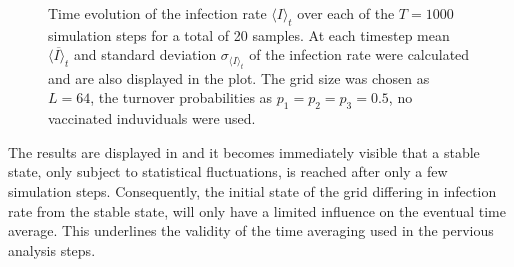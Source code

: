 \begin{figure}[ht]
    \centering
    \resizebox{\textwidth}{!}{}
    \caption{Time evolution of the infection rate $\langle I\rangle_t$ over each of the $T=1000$ simulation steps for a total of 20 samples. At each timestep mean $\overline{\langle I\rangle_t}$
    and standard deviation $\sigma_{\langle I\rangle_t}$ of the infection rate were calculated and are also displayed in the plot. The grid size was chosen as $L=64$, the turnover probabilities
    as $p_1=p_2=p_3=0.5$, no vaccinated induviduals were used.}\label{fig:res_dis_avg_inf_over_t}
\end{figure}

The results are displayed in  and it becomes immediately visible that a stable state, only subject to statistical fluctuations, is reached after only a few simulation steps.
Consequently, the initial state of the grid differing in infection rate from the stable state, will only have a limited influence on the eventual time average.
This underlines the validity of the time averaging used in the pervious analysis steps.